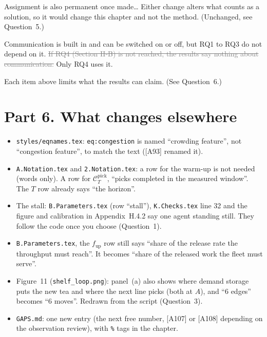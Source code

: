 \documentclass[11pt,a4paper]{article}
\newcommand{\new}[1]{\textcolor{newc}{#1}}
\newcommand{\old}[1]{\textcolor{gray}{\sout{#1}}}
\begin{document}
Assignment is also permanent once made\ldots{} Either change alters what
counts as a solution, so it would change this chapter and not the method.
(Unchanged, see Question~5.)

Communication is built in and can be switched on or off, but RQ1 to RQ3 do
not depend on it. \old{If RQ4 (Section II-B) is not reached, the results say
nothing about communication.} \new{Only RQ4 uses it.}

Each item above limits what the results can claim. (See Question~6.)

\section*{Part 6. What changes elsewhere}
\begin{itemize}[nosep]
  \item \texttt{styles/eqnames.tex}: \texttt{eq:congestion} is named
        ``crowding feature'', not ``congestion feature'', to match the text
        ([A93] renamed it).
  \item \texttt{A.Notation.tex} and \texttt{2.Notation.tex}: a row for the
        warm-up is not needed (words only). A row for
        $\mathcal{C}^{\mathrm{pick}}_T$, ``picks completed in the measured
        window''. The $T$ row already says ``the horizon''.
  \item The stall: \texttt{B.Parameters.tex} (row ``stall''),
        \texttt{K.Checks.tex} line 32 and the figure and calibration in
        Appendix~H.4.2 say one agent standing still. They follow the code
        once you choose (Question~1).
  \item \texttt{B.Parameters.tex}, the $f_{\mathrm{up}}$ row still says
        ``share of the release rate the throughput must reach''. It becomes
        ``share of the released work the fleet must serve''.
  \item Figure~11 (\texttt{shelf\_loop.png}): panel~(a) also shows where
        demand storage puts the new tea and where the next line picks (both
        at $A$), and ``6 edges'' becomes ``6 moves''. Redrawn from the
        script (Question~3).
  \item \texttt{GAPS.md}: one new entry (the next free number, [A107] or
        [A108] depending on the observation review), with \texttt{\%} tags in
        the chapter.
\end{itemize}
\end{document}
